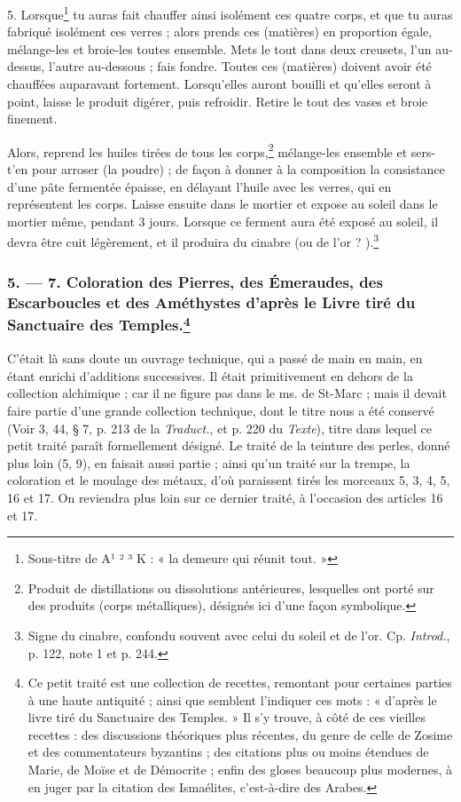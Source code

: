 \documentclass[a4paper, 11pt, oneside, polutonikogreek, french]{article}
\begin{document}
5. Lorsque\footnote{Sous-titre de A¹ ² ³ K : « la demeure qui réunit tout. »} tu auras fait chauffer ainsi isolément ces quatre corps, et que tu auras fabriqué isolément ces verres ; alors prends ces (matières) en proportion égale, mélange-les et broie-les toutes ensemble. Mets le tout dans deux creusets, l'un au-dessus, l'autre au-dessous ; fais fondre. Toutes ces (matières) doivent avoir été chauffées auparavant fortement. Lorsqu'elles auront bouilli et qu'elles seront à point, laisse le produit digérer, puis refroidir. Retire le tout des vases et broie finement.

Alors, reprend les huiles tirées de tous les corps,\footnote{Produit de distillations ou dissolutions antérieures, lesquelles ont porté sur des produits (corps métalliques), désignés ici d'une façon symbolique.} mélange-les ensemble et sers-t'en pour arroser (la poudre) ; de façon à donner à la composition la consistance d'une pâte fermentée épaisse, en délayant l'huile avec les verres, qui en représentent les corps. Laisse ensuite dans le mortier et expose au soleil dans le mortier même, pendant 3 jours. Lorsque ce ferment aura été exposé au soleil, il devra être cuit légèrement, et il produira du cinabre (ou de l'or ? ).\footnote{Signe du cinabre, confondu souvent avec celui du soleil et de l'or. Cp. \emph{Introd.}, p. 122, note 1 et p. 244.}

\bigskip
\centerline{\EightStarTaper}
\centerline{\EightStarTaper\EightStarTaper}
\bigskip

\subsubsection[5. --- 7. Coloration des Pierres, des Émeraudes, des Escarboucles et des Améthystes d'après le Livre tiré du Sanctuaire des Temples.]{5. --- 7. Coloration des Pierres, des Émeraudes, des Escarboucles et des Améthystes d'après le Livre tiré du Sanctuaire des Temples.\footnote{Ce petit traité est une collection de recettes, remontant pour certaines parties à une haute antiquité ; ainsi que semblent l'indiquer ces mots : « d'après le livre tiré du Sanctuaire des Temples. » Il s'y trouve, à côté de ces vieilles recettes : des discussions théoriques plus récentes, du genre de celle de Zosime et des commentateurs byzantins ; des citations plus ou moins étendues de Marie, de Moïse et de Démocrite ; enfin des gloses beaucoup plus modernes, à en juger par la citation des Ismaélites, c'est-à-dire des Arabes.  }}

C'était là sans doute un ouvrage technique, qui a passé de main en main, en étant enrichi d'additions successives. Il était primitivement en dehors de la collection alchimique ; car il ne figure pas dans le ms. de St-Marc ; mais il devait faire partie d'une grande collection technique, dont le titre nous a été conservé (Voir 3, 44, § 7, p. 213 de la \emph{Traduct.}, et p. 220 du \emph{Texte}), titre dans lequel ce petit traité paraît formellement désigné. Le traité de la teinture des perles, donné plus loin (5, 9), en faisait aussi partie ; ainsi qu'un traité sur la trempe, la coloration et le moulage des métaux, d'où paraissent tirés les morceaux 5, 3, 4, 5, 16 et 17. On reviendra plus loin sur ce dernier traité, à l'occasion des articles 16 et 17.
\end{document}
